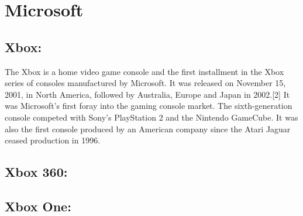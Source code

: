 \section{Microsoft}

\subsection{Xbox:}
The Xbox is a home video game console and the first installment in the Xbox
series of consoles manufactured by Microsoft. It was released on November 15,
2001, in North America, followed by Australia, Europe and Japan in 2002.[2]
It was Microsoft's first foray into the gaming console market. The
sixth-generation console competed with Sony's PlayStation 2 and the Nintendo
GameCube. It was also the first console produced by an American company since
the Atari Jaguar ceased production in 1996. 
\subsection{Xbox 360:}
\subsection{Xbox One:}



